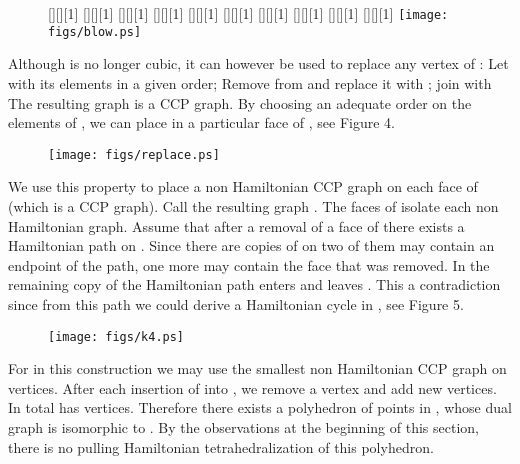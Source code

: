 \documentclass{article}
\begin{document}
\begin{figure} \label{con3ccp}
  \begin{center}
    [][][1]{}
    [][][1]{}
    [][][1]{}
    [][][1]{}
    [][][1]{}
    [][][1]{}
    [][][1]{}
    [][][1]{}
    [][][1]{}
    [][][1]{}
    \texttt{[image: figs/blow.ps]}
  \end{center}
    \caption{}
\end{figure}

Although  is no longer cubic, it can however be used to replace any vertex  of :
Let  with its elements in a given order; Remove  from  and replace it with ;
join  with  
The resulting graph  is a CCP graph. By choosing an adequate order on the elements of , we can place  in a particular face of , see Figure 4. \par

\begin{figure}\label{fig:choice}
	\begin{center}
  		\texttt{[image: figs/replace.ps]}
	\end{center}
	\caption{}
\end{figure}

We use this property to place a non Hamiltonian CCP graph  on each face of  (which is
a CCP graph). Call the resulting graph .
The faces of  isolate each non Hamiltonian graph. 
Assume that after a removal of a face of  there exists a Hamiltonian path on . 
Since there are  copies of  on 
two of them may contain an endpoint of the path, one more may contain the face that was removed.
In the remaining copy of  the Hamiltonian path enters and leaves . This a contradiction 
since from this path we could derive a Hamiltonian cycle in , see Figure 5.\par

\begin{figure}\label{fig:k4}
	\begin{center}
  		\texttt{[image: figs/k4.ps]}
	\end{center}
	\caption{}
\end{figure}


For  in this construction we may use the smallest non Hamiltonian CCP graph on  vertices.
After each insertion of  into , we remove a vertex  and add  new vertices.
 In total  has 
vertices. Therefore there exists a polyhedron of  points in , whose dual graph is isomorphic to . By the observations at the beginning of this section, there is no pulling Hamiltonian tetrahedralization of this polyhedron.\par
\end{document}
